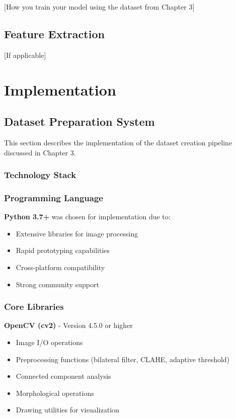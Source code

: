 \documentclass[12pt,a4paper,oneside]{report}
\begin{document}
[How you train your model using the dataset from Chapter 3]

\section{Feature Extraction}

[If applicable]

\chapter{Implementation}

\section{Dataset Preparation System}

This section describes the implementation of the dataset creation pipeline discussed in Chapter 3.

\subsection{Technology Stack}

\subsection{Programming Language}
\textbf{Python 3.7+} was chosen for implementation due to:
\begin{itemize}
    \item Extensive libraries for image processing
    \item Rapid prototyping capabilities
    \item Cross-platform compatibility
    \item Strong community support
\end{itemize}

\subsection{Core Libraries}

\textbf{OpenCV (cv2)} - Version 4.5.0 or higher
\begin{itemize}
    \item Image I/O operations
    \item Preprocessing functions (bilateral filter, CLAHE, adaptive threshold)
    \item Connected component analysis
    \item Morphological operations
    \item Drawing utilities for visualization
\end{itemize}
\end{document}
